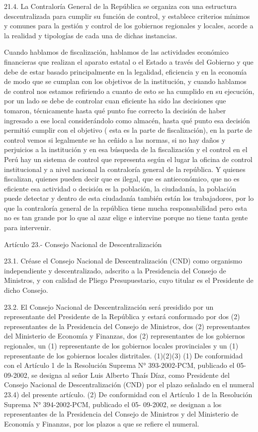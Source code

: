 \documentclass[
  a4paper,
]{article}
\begin{document}
21.4. La Contraloría General de la República se organiza con una
estructura descentralizada para cumplir su función de control, y
establece criterios mínimos y comunes para la gestión y control de los
gobiernos regionales y locales, acorde a la realidad y tipologías de
cada una de dichas instancias.

Cuando hablamos de fiscalización, hablamos de las actividades económico
financieras que realizan el aparato estatal o el Estado a través del
Gobierno y que debe de estar basado principalmente en la legalidad,
eficiencia y en la economía de modo que se cumplan con los objetivos de
la institución, y cuando hablamos de control nos estamos refiriendo a
cuanto de esto se ha cumplido en su ejecución, por un lado se debe de
controlar cuan eficiente ha sido las decisiones que tomaron,
técnicamente hasta qué punto fue correcto la decisión de haber ingresado
a ese local considerándolo como almacén, hasta qué punto esa decisión
permitió cumplir con el objetivo ( esta es la parte de fiscalización),
en la parte de control vemos si legalmente se ha ceñido a las normas, si
no hay daños y perjuicios a la institución y en esa búsqueda de la
fiscalización y el control en el Perú hay un sistema de control que
representa según el lugar la oficina de control institucional y a nivel
nacional la contraloría general de la república. Y quienes fiscalizan,
quienes pueden decir que es ilegal, que es antieconómico, que no es
eficiente esa actividad o decisión es la población, la ciudadanía, la
población puede detectar y dentro de esta ciudadanía también están los
trabajadores, por lo que la contraloría general de la república tiene
mucha responsabilidad pero esta no es tan grande por lo que al azar
elige e intervine porque no tiene tanta gente para intervenir.

Artículo 23.- Consejo Nacional de Descentralización

23.1. Créase el Consejo Nacional de Descentralización (CND) como
organismo independiente y descentralizado, adscrito a la Presidencia del
Consejo de Ministros, y con calidad de Pliego Presupuestario, cuyo
titular es el Presidente de dicho Consejo.

23.2. El Consejo Nacional de Descentralización será presidido por un
representante del Presidente de la República y estará conformado por dos
(2) representantes de la Presidencia del Consejo de Ministros, dos (2)
representantes del Ministerio de Economía y Finanzas, dos (2)
representantes de los gobiernos regionales, un (1) representante de los
gobiernos locales provinciales y un (1) representante de los gobiernos
locales distritales. (1)(2)(3) (1) De conformidad con el Artículo 1 de
la Resolución Suprema N° 393-2002-PCM, publicado el 05- 09-2002, se
designa al señor Luis Alberto Thaís Díaz, como Presidente del Consejo
Nacional de Descentralización (CND) por el plazo señalado en el numeral
23.4) del presente artículo. (2) De conformidad con el Artículo 1 de la
Resolución Suprema N° 394-2002-PCM, publicado el 05- 09-2002, se
designan a los representantes de la Presidencia del Consejo de Ministros
y del Ministerio de Economía y Finanzas, por los plazos a que se refiere
el numeral.
\end{document}

